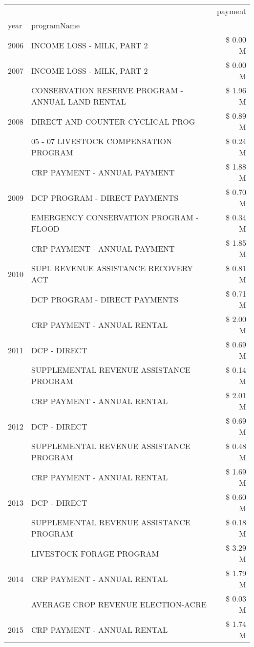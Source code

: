 \begin{tabular}{llr}
\toprule
 &  & payment \\
year & programName &  \\
\midrule
2006 & INCOME LOSS - MILK, PART 2 & \$ 0.00 M \\
\cline{1-3}
2007 & INCOME LOSS - MILK, PART 2 & \$ 0.00 M \\
\cline{1-3}
\multirow[t]{3}{*}{2008} & CONSERVATION RESERVE PROGRAM - ANNUAL LAND RENTAL & \$ 1.96 M \\
 & DIRECT AND COUNTER CYCLICAL PROG & \$ 0.89 M \\
 & 05 - 07 LIVESTOCK COMPENSATION PROGRAM & \$ 0.24 M \\
\cline{1-3}
\multirow[t]{3}{*}{2009} & CRP PAYMENT - ANNUAL PAYMENT & \$ 1.88 M \\
 & DCP PROGRAM - DIRECT PAYMENTS & \$ 0.70 M \\
 & EMERGENCY CONSERVATION PROGRAM - FLOOD & \$ 0.34 M \\
\cline{1-3}
\multirow[t]{3}{*}{2010} & CRP PAYMENT - ANNUAL PAYMENT & \$ 1.85 M \\
 & SUPL REVENUE ASSISTANCE RECOVERY ACT & \$ 0.81 M \\
 & DCP PROGRAM - DIRECT PAYMENTS & \$ 0.71 M \\
\cline{1-3}
\multirow[t]{3}{*}{2011} & CRP PAYMENT - ANNUAL RENTAL & \$ 2.00 M \\
 & DCP - DIRECT & \$ 0.69 M \\
 & SUPPLEMENTAL REVENUE ASSISTANCE PROGRAM & \$ 0.14 M \\
\cline{1-3}
\multirow[t]{3}{*}{2012} & CRP PAYMENT - ANNUAL RENTAL & \$ 2.01 M \\
 & DCP - DIRECT & \$ 0.69 M \\
 & SUPPLEMENTAL REVENUE ASSISTANCE PROGRAM & \$ 0.48 M \\
\cline{1-3}
\multirow[t]{3}{*}{2013} & CRP PAYMENT - ANNUAL RENTAL & \$ 1.69 M \\
 & DCP - DIRECT & \$ 0.60 M \\
 & SUPPLEMENTAL REVENUE ASSISTANCE PROGRAM & \$ 0.18 M \\
\cline{1-3}
\multirow[t]{3}{*}{2014} & LIVESTOCK FORAGE PROGRAM & \$ 3.29 M \\
 & CRP PAYMENT - ANNUAL RENTAL & \$ 1.79 M \\
 & AVERAGE CROP REVENUE ELECTION-ACRE & \$ 0.03 M \\
\cline{1-3}
\multirow[t]{3}{*}{2015} & CRP PAYMENT - ANNUAL RENTAL & \$ 1.74 M \\

\end{tabular}
